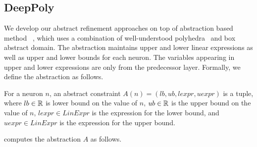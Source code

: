 


  



\subsection{DeepPoly}
\label{sec:deeppoly}

We develop our abstract refinement approaches on top of abstraction based method
\deeppoly{}~\cite{singh2019abstract}, which uses a combination of
well-understood polyhedra~\cite{cousot1978automatic} and box~\cite{cousot1977abstract} abstract domain.
The abstraction maintains upper and lower linear expressions as well as upper and lower bounds for each neuron.
The variables appearing in upper and lower expressions are only from the predecessor layer.
Formally, we define the abstraction as follows. 


\begin{df}
    For a neuron $n$,
    an abstract constraint $A(n) = (lb,ub, lexpr, uexpr)$ is a tuple, where
    $lb \in \mathbb{R}$ is lower bound on the value of $n$,
    $ub \in \mathbb{R}$ is the upper bound on the value of  $n$,
    $lexpr \in LinExpr$ is the expression for the lower bound, and
    $uexpr \in LinExpr$ is the expression for the upper bound.
\end{df}

\deeppoly{} computes the abstraction $A$ as follows.


